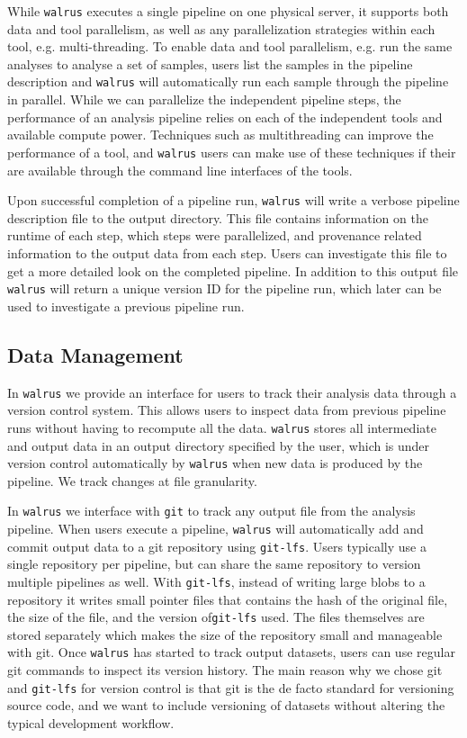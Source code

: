 While \texttt{walrus} executes a single pipeline on one physical server, it
supports both data and tool parallelism, as well as any parallelization
strategies within each tool, e.g. multi-threading. To enable data and tool
parallelism, e.g. run the same analyses to analyse a set of samples, users list
the samples in the pipeline description and \texttt{walrus} will automatically
run each sample through the pipeline in parallel. While we can parallelize the
independent pipeline steps, the performance of an analysis pipeline relies on
each of the independent tools and available compute power. Techniques such as
multithreading can improve the performance of a tool, and \texttt{walrus} users
can make use of these techniques if their are available through the command line
interfaces of the tools.

Upon successful completion of a pipeline run, \texttt{walrus} will write a
verbose pipeline description file to the output directory. This file contains
information on the runtime of each step, which steps were parallelized, and
provenance related information to the output data from each step. Users can
investigate this file to get a more detailed look on the completed pipeline. In
addition to this output file \texttt{walrus} will return a unique version ID for
the pipeline run, which later can be used to investigate a previous pipeline
run.


\subsection{Data Management}
In \texttt{walrus} we provide an interface for users to track their analysis
data through a version control system. 
This allows users to inspect data from previous pipeline runs without having to
recompute all the data. \texttt{walrus} stores all intermediate and output data
in an output directory specified by the user, which is under version control
automatically by \texttt{walrus} when new data is produced by the pipeline. We
track changes at file granularity. 

In \texttt{walrus} we interface with \texttt{git} to track any output file from
the analysis pipeline. When users execute a pipeline, \texttt{walrus} will
automatically add and commit output data to a git repository using
\texttt{git-lfs}.  Users typically use a single repository per pipeline, but can
share the same repository to version multiple pipelines as well. With
\texttt{git-lfs}, instead of writing large blobs to a repository it writes small
pointer files that contains the hash of the original file, the size of the file,
and the version of\texttt{git-lfs} used. The files themselves are stored
separately which makes the size of the repository small and manageable with git.
Once \texttt{walrus} has started to track output datasets, users can use regular
git commands to inspect its version history. 
The main reason why we chose git and \texttt{git-lfs} for version control is
that git is the de facto standard for versioning source code, and we want to
include versioning of datasets without altering the typical development
workflow. 


